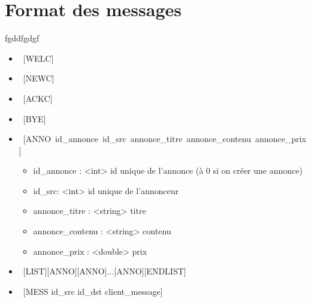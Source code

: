 \documentclass[12pt]{article}
\begin{document}
\section{Format des messages}
fgddfgdgf
\begin{itemize}
  \item~[WELC]
  \item~[NEWC]
  \item~[ACKC]
  \item~[BYE]
	\item~[ANNO~id\_annonce~id\_src~annonce\_titre~annonce\_contenu~annonce\_prix]
  \begin{itemize}
	  \item id\_annonce : <int>  id unique de l'annonce (à 0 si on créer une annonce)
    \item id\_src: <int> id unique de l'annonceur
    \item annonce\_titre : <string> titre
    \item annonce\_contenu : <string> contenu
    \item annonce\_prix : <double> prix
  \end{itemize}
  \item~[LIST][ANNO][ANNO]...[ANNO][ENDLIST]
  \item~[MESS id\_src id\_dst client\_message]
  \end{itemize}
\end{document}
